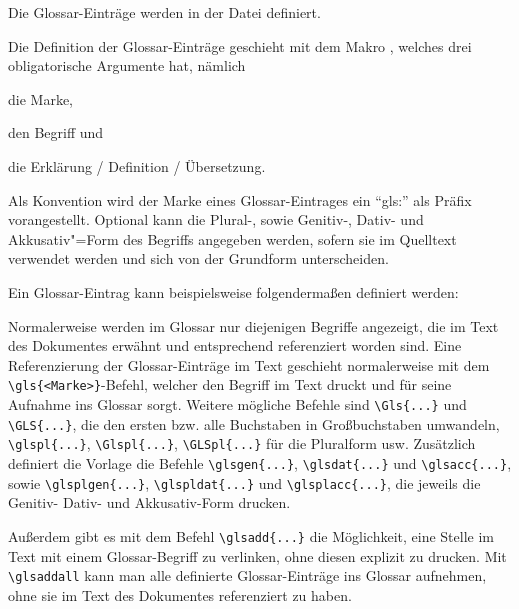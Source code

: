 Die Glossar-Einträge werden in der Datei   definiert.

Die Definition der Glossar-Einträge geschieht mit dem Makro ,
welches drei obligatorische Argumente hat, nämlich
\begin{itemize*}
\item die Marke,
\item den Begriff und
\item die Erklärung / Definition / Übersetzung.
\end{itemize*}
Als Konvention wird der Marke eines Glossar-Eintrages ein \enquote{gls:} als Präfix vorangestellt.
Optional kann die Plural-, sowie Genitiv-, Dativ- und Akkusativ"=Form des Begriffs angegeben werden,
sofern sie im Quelltext verwendet werden und sich von der Grundform unterscheiden.

Ein Glossar-Eintrag kann beispielsweise folgendermaßen definiert werden:
\begin{latex}[caption={Definition eines Glossar-Eintrages},label={lst:GlossEntry}]
\end{latex}

Normalerweise werden im Glossar nur diejenigen Begriffe angezeigt,
die im Text des Dokumentes erwähnt und entsprechend referenziert worden sind.
Eine Referenzierung der Glossar-Einträge im Text geschieht normalerweise mit dem
\lstinline|\gls{<Marke>}|-Befehl,
welcher den Begriff im Text druckt und für seine Aufnahme ins Glossar sorgt.
Weitere mögliche Befehle sind \lstinline|\Gls{...}| und \lstinline|\GLS{...}|,
die den ersten bzw. alle Buchstaben in Großbuchstaben umwandeln,
\lstinline|\glspl{...}|, \lstinline|\Glspl{...}|, \lstinline|\GLSpl{...}|
für die Pluralform usw.
Zusätzlich definiert die Vorlage die Befehle
\lstinline|\glsgen{...}|, \lstinline|\glsdat{...}| und \lstinline|\glsacc{...}|,
sowie
\lstinline|\glsplgen{...}|, \lstinline|\glspldat{...}| und \lstinline|\glsplacc{...}|,
die jeweils die Genitiv- Dativ- und Akkusativ-Form drucken.

Außerdem gibt es mit dem Befehl \lstinline|\glsadd{...}| die Möglichkeit,
eine Stelle im Text mit einem Glossar-Begriff zu verlinken, ohne diesen explizit zu drucken.
Mit \lstinline|\glsaddall| kann man alle definierte Glossar-Einträge ins Glossar aufnehmen,
ohne sie im Text des Dokumentes referenziert zu haben.

